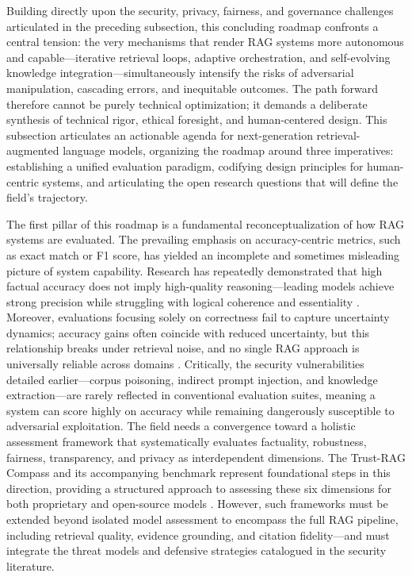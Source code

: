 \documentclass[11pt]{article}
\begin{document}
Building directly upon the security, privacy, fairness, and governance challenges articulated in the preceding subsection, this concluding roadmap confronts a central tension: the very mechanisms that render RAG systems more autonomous and capable---iterative retrieval loops, adaptive orchestration, and self-evolving knowledge integration---simultaneously intensify the risks of adversarial manipulation, cascading errors, and inequitable outcomes. The path forward therefore cannot be purely technical optimization; it demands a deliberate synthesis of technical rigor, ethical foresight, and human-centered design. This subsection articulates an actionable agenda for next-generation retrieval-augmented language models, organizing the roadmap around three imperatives: establishing a unified evaluation paradigm, codifying design principles for human-centric systems, and articulating the open research questions that will define the field's trajectory.

The first pillar of this roadmap is a fundamental reconceptualization of how RAG systems are evaluated. The prevailing emphasis on accuracy-centric metrics, such as exact match or F1 score, has yielded an incomplete and sometimes misleading picture of system capability. Research has repeatedly demonstrated that high factual accuracy does not imply high-quality reasoning---leading models achieve strong precision while struggling with logical coherence and essentiality \cite{ref626}. Moreover, evaluations focusing solely on correctness fail to capture uncertainty dynamics; accuracy gains often coincide with reduced uncertainty, but this relationship breaks under retrieval noise, and no single RAG approach is universally reliable across domains \cite{ref409}. Critically, the security vulnerabilities detailed earlier---corpus poisoning, indirect prompt injection, and knowledge extraction---are rarely reflected in conventional evaluation suites, meaning a system can score highly on accuracy while remaining dangerously susceptible to adversarial exploitation. The field needs a convergence toward a holistic assessment framework that systematically evaluates factuality, robustness, fairness, transparency, and privacy as interdependent dimensions. The Trust-RAG Compass and its accompanying benchmark represent foundational steps in this direction, providing a structured approach to assessing these six dimensions for both proprietary and open-source models \cite{ref77}. However, such frameworks must be extended beyond isolated model assessment to encompass the full RAG pipeline, including retrieval quality, evidence grounding, and citation fidelity---and must integrate the threat models and defensive strategies catalogued in the security literature.
\end{document}

